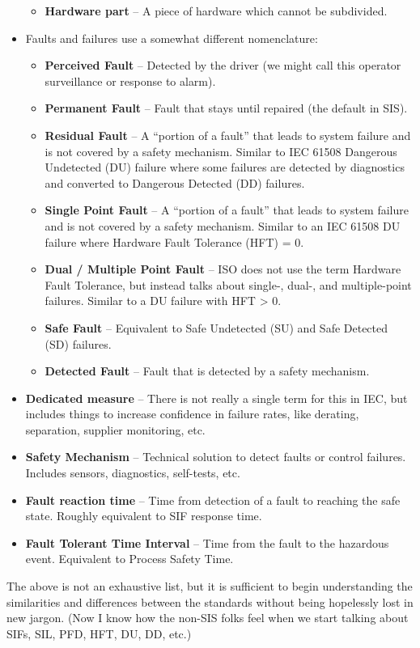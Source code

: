 \documentclass[./dissertation.tex]{subfiles}
\begin{document}
\begin{itemize}
\begin{itemize}
\item \textbf{Hardware part} – A piece of hardware which cannot be subdivided.
\end{itemize}
\item Faults and failures use a somewhat different nomenclature:
\begin{itemize}
\item \textbf{Perceived Fault} – Detected by the driver (we might call this operator surveillance or response to alarm).
\item \textbf{Permanent Fault} – Fault that stays until repaired (the default in SIS).
\item \textbf{Residual Fault} – A “portion of a fault” that leads to system failure and is not covered by a safety mechanism. Similar to IEC 61508 Dangerous Undetected (DU) failure where some failures are detected by diagnostics and converted to Dangerous Detected (DD) failures.
\item \textbf{Single Point Fault} – A “portion of a fault” that leads to system failure and is not covered by a safety mechanism. Similar to an IEC 61508 DU failure where Hardware Fault Tolerance (HFT) = 0.
\item \textbf{Dual / Multiple Point Fault} – ISO does not use the term Hardware Fault Tolerance, but instead talks about single-, dual-, and multiple-point failures. Similar to a DU failure with HFT > 0.
\item \textbf{Safe Fault} – Equivalent to Safe Undetected (SU) and Safe Detected (SD) failures.
\item \textbf{Detected Fault} – Fault that is detected by a safety mechanism.
\end{itemize}
\item \textbf{Dedicated measure} – There is not really a single term for this in IEC, but includes things to increase confidence in failure rates, like derating, separation, supplier monitoring, etc.
\item \textbf{Safety Mechanism} – Technical solution to detect faults or control failures. Includes sensors, diagnostics, self-tests, etc.
\item \textbf{Fault reaction time} – Time from detection of a fault to reaching the safe state. Roughly equivalent to SIF response time.
\item \textbf{Fault Tolerant Time Interval} – Time from the fault to the hazardous event. Equivalent to Process Safety Time.
\end{itemize}

The above is not an exhaustive list, but it is sufficient to begin understanding the similarities and differences between the standards without being hopelessly lost in new jargon. (Now I know how the non-SIS folks feel when we start talking about SIFs, SIL, PFD, HFT, DU, DD, etc.)
\end{document}
